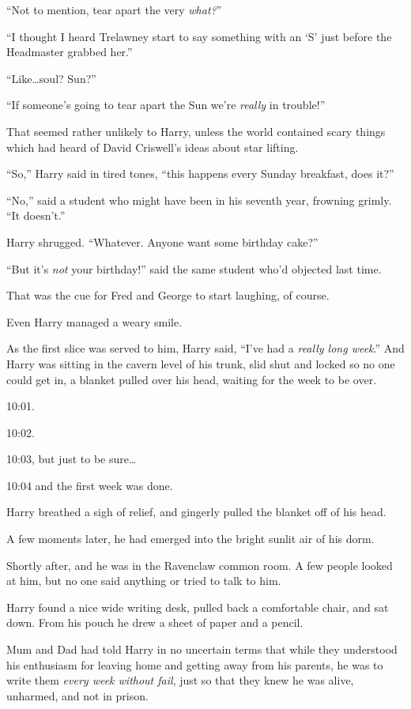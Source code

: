 “Not to mention, tear apart the very \emph{what?}”

“I thought I heard Trelawney start to say something with an ‘S’ just before the
Headmaster grabbed her.”

“Like…soul? Sun?”

“If someone’s going to tear apart the Sun we’re \emph{really} in trouble!”

That seemed rather unlikely to Harry, unless the world contained scary things
which had heard of David Criswell’s ideas about star lifting.

“So,” Harry said in tired tones, “this happens every Sunday breakfast, does it?”

“No,” said a student who might have been in his seventh year, frowning grimly.
“It doesn’t.”

Harry shrugged. “Whatever. Anyone want some birthday cake?”

“But it’s \emph{not} your birthday!” said the same student who’d objected last
time.

That was the cue for Fred and George to start laughing, of course.

Even Harry managed a weary smile.

As the first slice was served to him, Harry said, “I’ve had a \emph{really long
week}.”
\later
And Harry was sitting in the cavern level of his trunk, slid shut and locked so
no one could get in, a blanket pulled over his head, waiting for the week to be
over.

10:01.

10:02.

10:03, but just to be sure…

10:04 and the first week was done.

Harry breathed a sigh of relief, and gingerly pulled the blanket off of his
head.

A few moments later, he had emerged into the bright sunlit air of his dorm.

Shortly after, and he was in the Ravenclaw common room. A few people looked at
him, but no one said anything or tried to talk to him.

Harry found a nice wide writing desk, pulled back a comfortable chair, and sat
down. From his pouch he drew a sheet of paper and a pencil.

Mum and Dad had told Harry in no uncertain terms that while they understood his
enthusiasm for leaving home and getting away from his parents, he was to write
them \emph{every week without fail}, just so that they knew he was alive,
unharmed, and not in prison.

